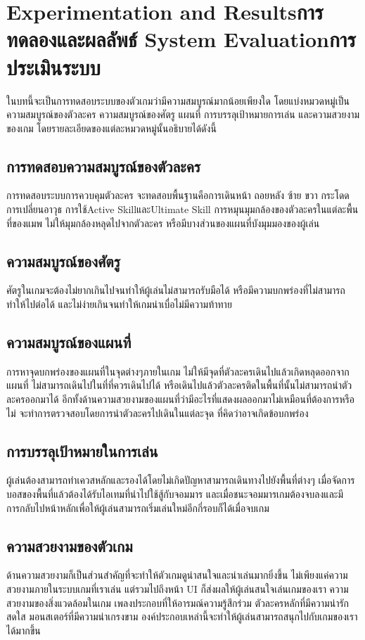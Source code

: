 \chapter{\ifproject%
\ifenglish Experimentation and Results\else การทดลองและผลลัพธ์\fi
\else%
\ifenglish System Evaluation\else การประเมินระบบ\fi
\fi}

\enskip \enskip \enskip \enskip \enskip ในบทนี้จะเป็นการทดสอบระบบของตัวเกมว่ามีความสมบูรณ์มากน้อยเพียงใด โดยแบ่งหมวดหมู่เป็น ความสมบูรณ์ของตัวละคร  ความสมบูรณ์ของศัตรู  แผนที่ การบรรลุเป้าหมายการเล่น และความสวยงามของเกม โดยรายละเอียดของแต่ละหมวดหมู่นั้นอธิบายได้ดังนี้
\section{การทดสอบความสมบูรณ์ของตัวละคร}
การทดสอบระบบการควบคุมตัวละคร จะทดสอบพื้นฐานคือการเดินหน้า ถอยหลัง ซ้าย ขวา กระโดด การเปลี่ยนอาวุธ การใช้Active SkillและUltimate Skill การหมุนมุมกล้องของตัวละครในแต่ละพื้นที่ของแมพ ไม่ให้มุมกล้องหลุดไปจากตัวละคร หรือมีบางส่วนของแผนที่บังมุมมองของผู้เล่น 
\section{ความสมบูรณ์ของศัตรู }
ศัตรูในเกมจะต้องไม่ยากเกินไปจนทำให้ผู้เล่นไม่สามารถรับมือได้ หรือมีความบกพร่องที่ไม่สามารถทำให้ไปต่อได้ และไม่ง่ายเกินจนทำให้เกมน่าเบื่อไม่มีความท้าทาย

\section{ความสมบูรณ์ของแผนที่}
การหาจุดบกพร่องของแผนที่ในจุดต่างๆภายในเกม ไม่ให้มีจุดที่ตัวละครเดินไปแล้วเกิดหลุดออกจากแผนที่ ไม่สามารถเดินไปในที่ที่ควรเดินไปได้ หรือเดินไปแล้วตัวละครติดในพื้นที่นั้นไม่สามารถนำตัวละครออกมาได้ อีกทั้งด้านความสวยงามของแผนที่ว่ามีอะไรที่แสดงผลออกมาไม่เหมือนที่ต้องการหรือไม่ จะทำการตรวจสอบโดยการนำตัวละครไปเดินในแต่ละจุด ที่คิดว่าอาจเกิดข้อบกพร่อง 

\section{การบรรลุเป้าหมายในการเล่น}
ผู้เล่นต้องสามารถทำเควสหลักและรองได้โดยไม่เกิดปัญหาสามารถเดินทางไปยังพื้นที่ต่างๆ เมื่อจัดการบอสของพื้นที่แล้วต้องได้รับไอเทมที่นำไปใช้สู้กับจอมมาร และเมื่อชนะจอมมารเกมต้องจบลงและมีการกลับไปหน้าหลักเพื่อให้ผู้เล่นสามารถเริ่มเล่นใหม่อีกกี่รอบก็ได้เมื่อจบเกม

\section{ความสวยงามของตัวเกม}
ด้านความสวยงามก็เป็นส่วนสำคัญที่จะทำให้ตัวเกมดูน่าสนใจและน่าเล่นมากยิ่งขึ้น ไม่เพียงแค่ความ สวยงามภายในระบบเกมที่เราเล่น แต่รวมไปถึงหน้า UI ก็ส่งผลให้ผู้เล่นสนใจเล่นเกมของเรา ความสวยงามของสิ่งแวดล้อมในเกม เพลงประกอบที่ให้อารมณ์ความรู้สึกร่วม ตัวละครหลักที่มีความน่ารักสดใส มอนสเตอร์ที่มีความน่าเกรงขาม องค์ประกอบเหล่านี้จะทำให้ผู้เล่นสามารถสนุกไปกับเกมของเราได้มากขึ้น

